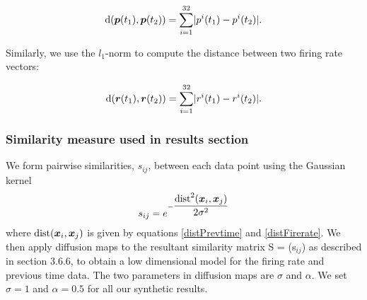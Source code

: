 \begin{equation}\label{distPrevtime}
\text{d}(\boldsymbol{p}(t_{1}), \boldsymbol{p}(t_{2}) ) = 
\displaystyle \sum_{i=1}^{32} \lvert p^{i}(t_{1}) - p^{i}(t_{2})   \rvert.
\end{equation}

Similarly, we use the $l_{1}$-norm to compute the distance between two firing rate vectors:

\begin{equation}\label{distFirerate}
\text{d}(\boldsymbol{r}(t_{1}), \boldsymbol{r}(t_{2}) ) = 
\displaystyle \sum_{i=1}^{32} \lvert r^{i}(t_{1}) - r^{i}(t_{2})   \rvert.
\end{equation}


\subsubsection{Similarity measure used in results section}
We form pairwise similarities, $s_{ij}$, between each data point
using the Gaussian kernel 
\[
s_{ij} = e^{-\dfrac{\text{dist}^{2}(\boldsymbol{x}_{i}, \boldsymbol{x}_{j})}{2\sigma^2}} 
\]
where $\text{dist}(\boldsymbol{x}_{i}, \boldsymbol{x}_{j})$ is given by equations
\eqref{distPrevtime} and \eqref{distFirerate}.
We then apply diffusion maps to the resultant similarity matrix S = (s$_{ij}$) 
as described in section 3.6.6, to obtain a low dimensional model for the 
firing rate and previous time data.
The two parameters in diffusion maps are $\sigma$ and $\alpha$.
We set $\sigma =1$ and $\alpha = 0.5$ for all our synthetic results.


























